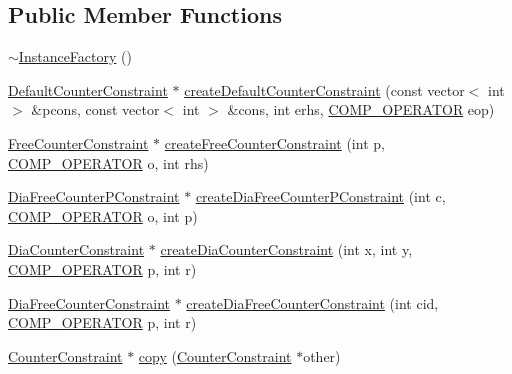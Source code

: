 \subsection*{Public Member Functions}
\begin{DoxyCompactItemize}
\item 
\mbox{\hyperlink{classgraphsat_1_1_instance_factory_a2a267949518b2bd1a09090757fe46a79}{$\sim$\+Instance\+Factory}} ()
\item 
\mbox{\hyperlink{classgraphsat_1_1_default_counter_constraint}{Default\+Counter\+Constraint}} $\ast$ \mbox{\hyperlink{classgraphsat_1_1_instance_factory_ac2eb9868107cc51e21a0e698d016267d}{create\+Default\+Counter\+Constraint}} (const vector$<$ int $>$ \&pcons, const vector$<$ int $>$ \&cons, int erhs, \mbox{\hyperlink{namespacegraphsat_acfb5939f9bdafbd9aea0d084b9a56f69}{C\+O\+M\+P\+\_\+\+O\+P\+E\+R\+A\+T\+OR}} eop)
\item 
\mbox{\hyperlink{classgraphsat_1_1_free_counter_constraint}{Free\+Counter\+Constraint}} $\ast$ \mbox{\hyperlink{classgraphsat_1_1_instance_factory_a5549e171c6cfd167f94ad16b35989391}{create\+Free\+Counter\+Constraint}} (int p, \mbox{\hyperlink{namespacegraphsat_acfb5939f9bdafbd9aea0d084b9a56f69}{C\+O\+M\+P\+\_\+\+O\+P\+E\+R\+A\+T\+OR}} o, int rhs)
\item 
\mbox{\hyperlink{classgraphsat_1_1_dia_free_counter_p_constraint}{Dia\+Free\+Counter\+P\+Constraint}} $\ast$ \mbox{\hyperlink{classgraphsat_1_1_instance_factory_a368a7bc5de4eae0d19b631e12f88e00d}{create\+Dia\+Free\+Counter\+P\+Constraint}} (int c, \mbox{\hyperlink{namespacegraphsat_acfb5939f9bdafbd9aea0d084b9a56f69}{C\+O\+M\+P\+\_\+\+O\+P\+E\+R\+A\+T\+OR}} o, int p)
\item 
\mbox{\hyperlink{classgraphsat_1_1_dia_counter_constraint}{Dia\+Counter\+Constraint}} $\ast$ \mbox{\hyperlink{classgraphsat_1_1_instance_factory_a3a7fcb2873970201601471c4cdbeeeff}{create\+Dia\+Counter\+Constraint}} (int x, int y, \mbox{\hyperlink{namespacegraphsat_acfb5939f9bdafbd9aea0d084b9a56f69}{C\+O\+M\+P\+\_\+\+O\+P\+E\+R\+A\+T\+OR}} p, int r)
\item 
\mbox{\hyperlink{classgraphsat_1_1_dia_free_counter_constraint}{Dia\+Free\+Counter\+Constraint}} $\ast$ \mbox{\hyperlink{classgraphsat_1_1_instance_factory_a1b318d873913d4a12ea15b91e12e6b30}{create\+Dia\+Free\+Counter\+Constraint}} (int cid, \mbox{\hyperlink{namespacegraphsat_acfb5939f9bdafbd9aea0d084b9a56f69}{C\+O\+M\+P\+\_\+\+O\+P\+E\+R\+A\+T\+OR}} p, int r)
\item 
\mbox{\hyperlink{classgraphsat_1_1_counter_constraint}{Counter\+Constraint}} $\ast$ \mbox{\hyperlink{classgraphsat_1_1_instance_factory_a309e53f4685517176eed7649eda1e9e7}{copy}} (\mbox{\hyperlink{classgraphsat_1_1_counter_constraint}{Counter\+Constraint}} $\ast$other)

\end{DoxyCompactItemize}
